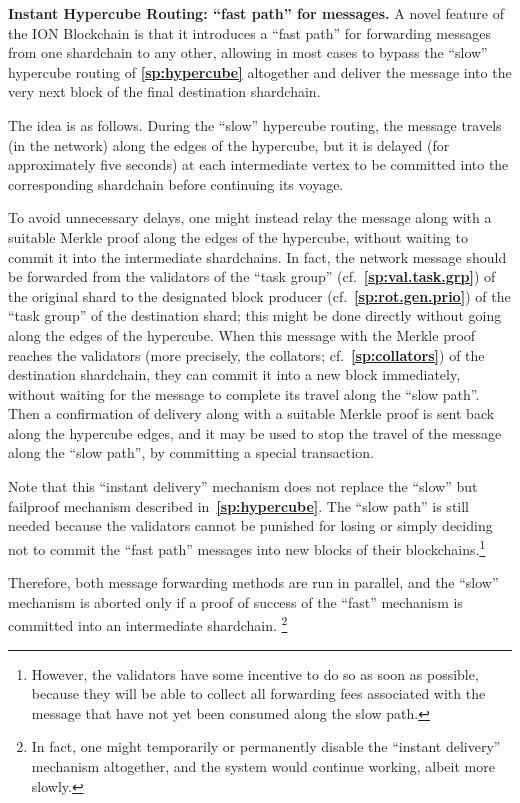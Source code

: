 \documentclass[12pt,oneside]{article}
\def\makepoint#1{\medbreak\noindent{\bf #1.\ }}
\def\nxsubpoint{\refstepcounter{subsubsection}%
  \smallbreak\makepoint{\thesubsubsection}}
\def\refpoint#1{{\rm\textbf{\ref{#1}}}}
\let\ptref=\refpoint
\def\embt(#1.){\textbf{#1.}}
\begin{document}
\nxsubpoint\label{sp:instant.hypercube} \embt(Instant Hypercube
Routing: ``fast path'' for messages.)  A novel feature of the ION
Blockchain is that it introduces a ``fast path'' for forwarding
messages from one shardchain to any other, allowing in most cases to
bypass the ``slow'' hypercube routing of \ptref{sp:hypercube}
altogether and deliver the message into the very next block of the
final destination shardchain.

The idea is as follows. During the ``slow'' hypercube routing, the
message travels (in the network) along the edges of the hypercube, but
it is delayed (for approximately five seconds) at each intermediate
vertex to be committed into the corresponding shardchain before
continuing its voyage.

To avoid unnecessary delays, one might instead relay the message along
with a suitable Merkle proof along the edges of the hypercube, without
waiting to commit it into the intermediate shardchains. In fact, the
network message should be forwarded from the validators of the ``task
group'' (cf.~\ptref{sp:val.task.grp}) of the original shard to the
designated block producer (cf.~\ptref{sp:rot.gen.prio}) of the ``task
group'' of the destination shard; this might be done directly without
going along the edges of the hypercube. When this message with the
Merkle proof reaches the validators (more precisely, the collators;
cf.~\ptref{sp:collators}) of the destination shardchain, they can
commit it into a new block immediately, without waiting for the
message to complete its travel along the ``slow path''. Then a
confirmation of delivery along with a suitable Merkle proof is sent
back along the hypercube edges, and it may be used to stop the travel
of the message along the ``slow path'', by committing a special
transaction.

Note that this ``instant delivery'' mechanism does not replace the
``slow'' but failproof mechanism described
in~\ptref{sp:hypercube}. The ``slow path'' is still needed because the
validators cannot be punished for losing or simply deciding not to
commit the ``fast path'' messages into new blocks of their
blockchains.\footnote{However, the validators have some incentive to do
  so as soon as possible, because they will be able to collect all
  forwarding fees associated with the message that have not yet been
  consumed along the slow path.}

Therefore, both message forwarding methods are run in parallel, and
the ``slow'' mechanism is aborted only if a proof of success of the
``fast'' mechanism is committed into an intermediate shardchain.%
\footnote{In fact, one might temporarily or permanently disable the
  ``instant delivery'' mechanism altogether, and the system would
  continue working, albeit more slowly.}
\end{document}
